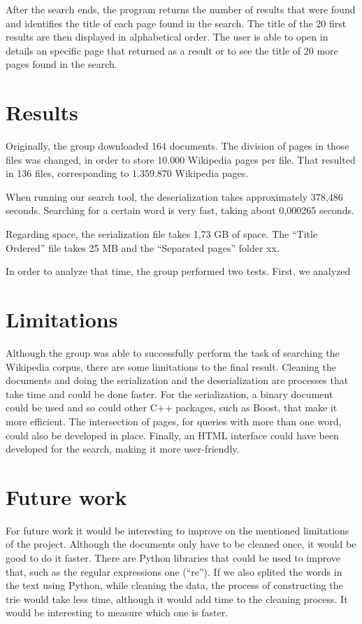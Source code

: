 \documentclass{article}
\begin{document}
After the search ends, the program returns the number of results that were found and identifies the title of each page found in the search. The title of the 20 first results are then displayed in alphabetical order. The user is able to open in details an specific page that returned as a result or to see the title of 20 more pages found in the search. 


\section*{Results}
Originally, the group downloaded 164 documents. The division of pages in those files was changed, in order to store 10.000 Wikipedia pages per file. That resulted in 136 files, corresponding to 1.359.870 Wikipedia pages. 

When running our search tool, the deserialization takes approximately 378,486 seconds. Searching for a certain word is very fast, taking about 0,000265 seconds. 

Regarding space, the serialization file takes 1,73 GB of space. The ``Title Ordered'' file takes 25 MB and the ``Separated pages'' folder xx. 

In order to analyze that time, the group performed two tests. First, we analyzed 

\section*{Limitations}
Although the group was able to successfully perform the task of searching the Wikipedia corpus, there are some limitations to the final result. Cleaning the documents and doing the serialization and the deserialization are processes that take time and could be done faster. For the serialization, a binary document could be used and so could other C++ packages, such as Boost, that make it more efficient. The intersection of pages, for queries with more than one word, could also be developed in place. Finally, an HTML interface could have been developed for the search, making it more user-friendly.

\section*{Future work}
For future work it would be interesting to improve on the mentioned limitations of the project. Although the documents only have to be cleaned once, it would be good to do it faster. There are Python libraries that could be used to improve that, such as the regular expressions one (``re''). If we also splited the words in the text using Python, while cleaning the data, the process of constructing the trie would take less time, although it would add time to the cleaning process. It would be interesting to measure which one is faster.
\end{document}

